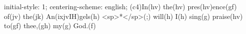 initial-style: 1;
centering-scheme: english;
(c4)In(hv) the(hv) pres(hv)ence(gf) of(jv) the(jk) An(ixjvIH)gels(h) <sp>*</sp>(;) will(h) I(h) sing(g) praise(hv) to(gf) thee,(gh) my(g) God.(f)
